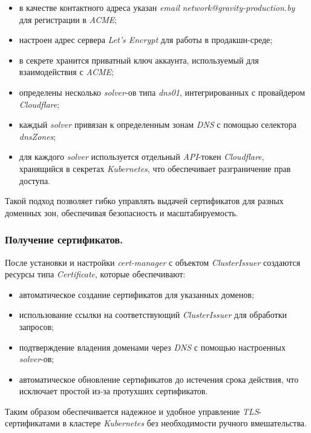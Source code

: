 \begin{itemize}
    \item в качестве контактного адреса указан \textit{email} \textit{network@gravity-production.by} для регистрации в \textit{ACME};
    \item настроен адрес сервера \textit{Let's Encrypt} для работы в продакшн-среде;
    \item в секрете хранится приватный ключ аккаунта, используемый для взаимодействия с \textit{ACME};
    \item определены несколько \textit{solver}-ов типа \textit{dns01}, интегрированных с провайдером \textit{Cloudflare};
    \item каждый \textit{solver} привязан к определенным зонам \textit{DNS} с помощью селектора \textit{dnsZones};
    \item для каждого \textit{solver} используется отдельный \textit{API}-токен \textit{Cloudflare}, хранящийся в секретах \textit{Kubernetes}, что обеспечивает разграничение прав доступа.
\end{itemize}

Такой подход позволяет гибко управлять выдачей сертификатов для разных доменных зон, обеспечивая безопасность и масштабируемость.

\subsubsection{Получение сертификатов.} После установки и настройки \textit{cert-manager} с объектом \textit{ClusterIssuer} создаются ресурсы типа \textit{Certificate}, которые обеспечивают:

\begin{itemize}
    \item автоматическое создание сертификатов для указанных доменов;
    \item использование ссылки на соответствующий \textit{ClusterIssuer} для обработки запросов;
    \item подтверждение владения доменами через \textit{DNS} с помощью настроенных \textit{solver}-ов;
    \item автоматическое обновление сертификатов до истечения срока действия, что исключает простой из-за протухших сертификатов.
\end{itemize}

Таким образом обеспечивается надежное и удобное управление \textit{TLS}-сертификатами в кластере \textit{Kubernetes} без необходимости ручного вмешательства.



